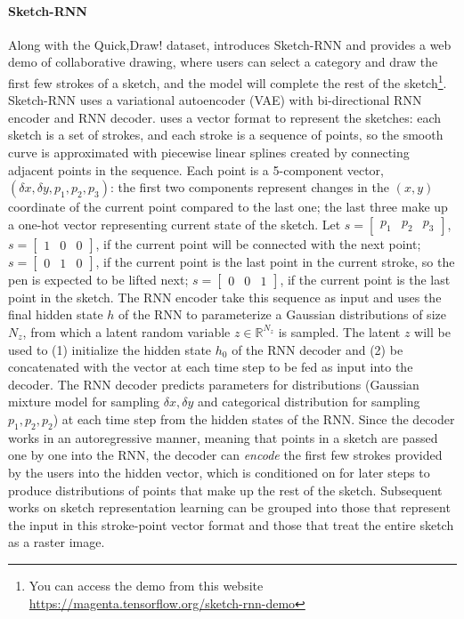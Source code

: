 \paragraph{Sketch-RNN}
Along with the Quick,Draw! dataset, \cite{ha2017neural} introduces Sketch-RNN and provides a web demo of collaborative drawing, where users can select a category and draw the first few strokes of a sketch, and the model will complete the rest of the sketch\footnote{You can access the demo from this website \url{https://magenta.tensorflow.org/sketch-rnn-demo}}. Sketch-RNN uses a variational autoencoder (VAE) with bi-directional RNN encoder and RNN decoder. 
\cite{ha2017neural} uses a vector format to represent the sketches: each sketch is a set of strokes, and each stroke is a sequence of points, so the smooth curve is approximated with piecewise linear splines created by connecting adjacent points in the sequence. Each point is a 5-component vector, $(\delta x, \delta y, p_1, p_2, p_3)$: the first two components represent changes in the $(x,y)$ coordinate of the current point compared to the last one; the last three make up a one-hot vector representing current state of the sketch. Let $s = \begin{bmatrix}p_1 & p_2 & p_3\end{bmatrix}$,
$ s = \begin{bmatrix}1 & 0 & 0\end{bmatrix}$, if the current point will be connected with the next point;
$s = \begin{bmatrix}0 & 1 & 0\end{bmatrix}$, if the current point is the last point in the current stroke, so the pen is expected to be lifted next;
$s = \begin{bmatrix}0 & 0 & 1\end{bmatrix}$, if the current point is the last point in the sketch.     
The RNN encoder take this sequence as input and uses the final hidden state $h$ of the RNN to parameterize a Gaussian distributions of size $N_z$, from which a latent random variable $z \in \mathbb{R}^{N_z}$ is sampled. The latent $z$ will be used to (1) initialize the hidden state $h_0$ of the RNN decoder and (2) be concatenated with the vector at each time step to be fed as input into the decoder.  
The RNN decoder predicts parameters for distributions (Gaussian mixture model for sampling $\delta x, \delta y$ and categorical distribution for sampling $p_1,p_2,p_2$) at each time step from the hidden states of the RNN. Since the decoder works in an autoregressive manner, meaning that points in a sketch are passed one by one into the RNN, the decoder can \textit{encode} the first few strokes provided by the users into the hidden vector, which is conditioned on for later steps to produce distributions of points that make up the rest of the sketch. 
Subsequent works on sketch representation learning can be grouped into those that represent the input in this stroke-point vector format and those that treat the entire sketch as a raster image. 

